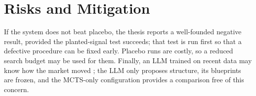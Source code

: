 \documentclass[12pt,a4paper,oneside]{book}
\theoremstyle{definition}
\begin{document}
\section{Risks and Mitigation}

If the system does not beat placebo, the thesis reports a well-founded negative result, provided the planted-signal test succeeds; that test is run first so that a defective procedure can be fixed early. Placebo runs are costly, so a reduced search budget may be used for them. Finally, an LLM trained on recent data may know how the market moved \cite{shi2026}; the LLM only proposes structure, its blueprints are frozen, and the MCTS-only configuration provides a comparison free of this concern.

\end{document}
